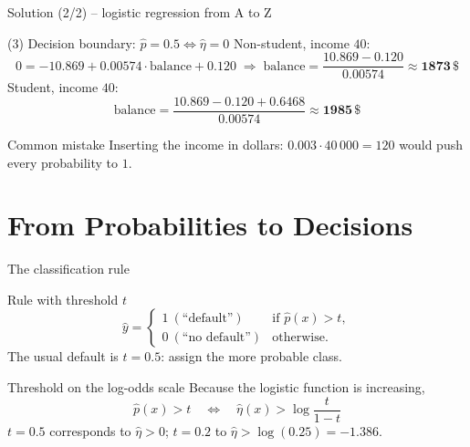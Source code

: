 \documentclass[aspectratio=169,11pt]{beamer}
\begin{document}
\begin{frame}{Solution (2/2) -- logistic regression from A to Z}
  \begin{exampleblock}{(3) Decision boundary: $\hat p=0.5\Leftrightarrow\hat\eta=0$}
    Non-student, income $40$:
    \[
      0=-10.869+0.00574\cdot\text{balance}+0.120
      \;\Rightarrow\;
      \text{balance}=\frac{10.869-0.120}{0.00574}\approx\textbf{1873}\,\$
    \]
    Student, income $40$:
    \[
      \text{balance}=\frac{10.869-0.120+0.6468}{0.00574}\approx\textbf{1985}\,\$
    \]
  \end{exampleblock}
  \begin{alertblock}{Common mistake}
    Inserting the income in dollars: $0.003\cdot40\,000=120$ would push every
    probability to $1$.
  \end{alertblock}
\end{frame}

\section[Decisions]{From Probabilities to Decisions}

\begin{frame}{The classification rule}
  \begin{block}{Rule with threshold $t$}
    \[
      \hat y=\begin{cases}1\ (\text{``default''}) & \text{if } \hat p(x)>t,\\
                         0\ (\text{``no default''}) & \text{otherwise.}\end{cases}
    \]
    The usual default is $t=0.5$: assign the more probable class.
  \end{block}
  \begin{block}{Threshold on the log-odds scale}
    Because the logistic function is increasing,
    \[
      \hat p(x)>t \quad\Longleftrightarrow\quad \hat\eta(x)>\log\frac{t}{1-t}
    \]
    $t=0.5$ corresponds to $\hat\eta>0$; $t=0.2$ to $\hat\eta>\log(0.25)=-1.386$.
  \end{block}
\end{frame}
\end{document}
